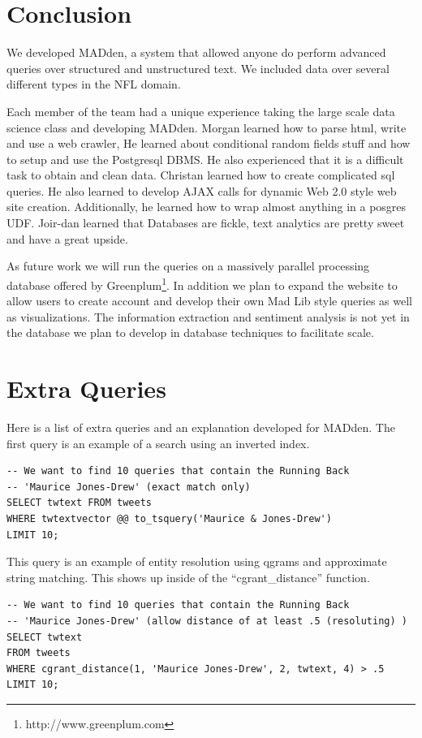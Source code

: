 \documentclass[11pt,onecolumn]{article}
\newcommand{\system}{MADden\xspace}
\begin{document}
  \section{Conclusion}
We developed \system, a system that allowed anyone do perform advanced
queries over structured and unstructured text.
We included data over several different types in the NFL domain.

    Each member of the team had a unique experience taking the large scale
data science class and developing \system.
		Morgan learned how to parse html, write and use a web crawler, 
		He learned about conditional random fields stuff and how to setup and use
		the Postgresql DBMS. He also experienced that it is a difficult task to
		obtain and clean data.
		Christan learned how to create complicated sql queries. 
He also learned to develop AJAX calls for dynamic Web 2.0 style 
web site creation.
Additionally, he learned how to wrap almost 
		anything in a posgres UDF. 
		Joir-dan learned that Databases are fickle, text analytics are pretty sweet and have a great upside.

As future work we will run the queries on a massively parallel processing 
database offered by Greenplum\footnote{http://www.greenplum.com}.
In addition we plan to expand the website
to allow users to create account and develop their own Mad Lib style 
queries as well as visualizations.
The information extraction and sentiment analysis is not yet in the database
we plan to develop in database techniques to facilitate scale.




\appendix

\section{Extra Queries}
\label{sec:extraqueries}
Here is a list of extra queries and an explanation developed for \system.
The first query is an example of a search using an inverted index.
\begin{verbatim}
-- We want to find 10 queries that contain the Running Back 
-- 'Maurice Jones-Drew' (exact match only)
SELECT twtext FROM tweets
WHERE twtextvector @@ to_tsquery('Maurice & Jones-Drew')
LIMIT 10;
\end{verbatim}


This query is an example of entity resolution using qgrams and approximate 
string matching. This shows up inside of the ``cgrant\_distance'' function.
\begin{verbatim}
-- We want to find 10 queries that contain the Running Back 
-- 'Maurice Jones-Drew' (allow distance of at least .5 (resoluting) )
SELECT twtext 
FROM tweets
WHERE cgrant_distance(1, 'Maurice Jones-Drew', 2, twtext, 4) > .5
LIMIT 10;
\end{verbatim}
\end{document}

